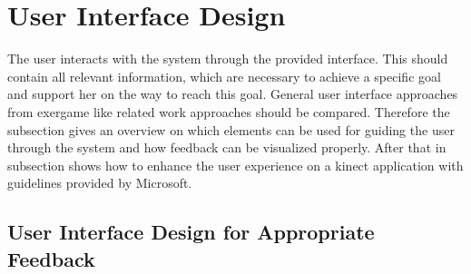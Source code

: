 \section{User Interface Design}
The user interacts with the system through the provided interface. This should contain all relevant information, which are necessary to achieve a specific goal and support her on the way to reach this goal. General user interface approaches from exergame like related work approaches should be compared. Therefore the subsection \textit{} gives an overview on which elements can be used for guiding the user through the system and how feedback can be visualized properly. After that in subsection \textit{} shows how to enhance the user experience on a kinect application with guidelines provided by Microsoft.

\subsection{User Interface Design for Appropriate Feedback}\label{2_5_1_userInterfacefeedback}

